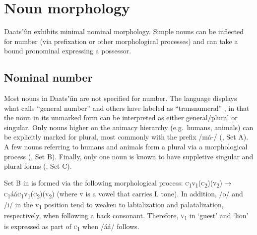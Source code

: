 \documentclass[output=paper]{langsci/langscibook}
\begin{document}
\section{Noun morphology}\label{sec:ahlandc:7}


Daatsʼ\'{i}in exhibits minimal nominal morphology. Simple nouns can be inflected for number (via prefixation or other morphological processes) and can take a bound  pronominal expressing a possessor.  

\subsection{Nominal number}\label{sec:ahlandc:7.1}


Most nouns in Daatsʼ\'{i}in are not specified for number. The language displays what \citet{Corbett2000} calls “general number” and others have labeled as “transnumeral” \citep{Biermann1982,StorchDimmendaal2014}, in that the noun in its unmarked form can be interpreted as either general/plural or singular. Only nouns higher on the animacy hierarchy (e.g.\ humans, animals) can be explicitly marked for plural, most commonly with the prefix /m\'{a}-/ (, Set A). A few nouns referring to humans and animals form a plural via a morphological process (, Set B). Finally, only one noun is known to have suppletive singular and plural forms (, Set C).

Set B in  is formed via the following morphological process: \textsc{c}\textsubscript{1}v\textsubscript{1}(\textsc{c}\textsubscript{2})(\textsc{v}\textsubscript{2}) → \textsc{c}\textsubscript{1}\'{a}\'{a}\textsc{c}\textsubscript{1}\textsc{\`{v}}\textsubscript{1}(\textsc{c}\textsubscript{2})(\textsc{v}\textsubscript{2}) (where \textsc{\`{v}} is a vowel that carries L tone). In addition, /o/ and /i/ in the v\textsubscript{1} position tend to weaken to labialization and palatalization, respectively, when following a back consonant. Therefore, \textsc{v}\textsubscript{1} in ‘guest’ and ‘lion’ is expressed as part of \textsc{c}\textsubscript{1} when /\'{a}\'{a}/ follows.
\end{document}
